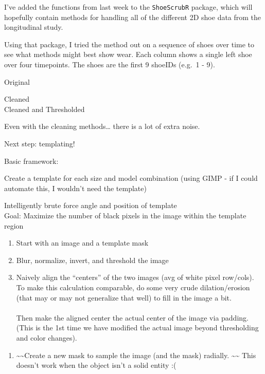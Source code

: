 \documentclass[]{book}
\providecommand{\tightlist}{%
  \setlength{\itemsep}{0pt}\setlength{\parskip}{0pt}}
\begin{document}
I've added the functions from last week to the \texttt{ShoeScrubR} package, which will hopefully contain methods for handling all of the different 2D shoe data from the longitudinal study.

Using that package, I tried the method out on a sequence of shoes over time to see what methods might best show wear. Each column shows a single left shoe over four timepoints. The shoes are the first 9 shoeIDs (e.g.~1 - 9).

Original

Cleaned\\

Cleaned and Thresholded

Even with the cleaning methods\ldots{} there is a lot of extra noise.

Next step: templating!

Basic framework:

Create a template for each size and model combination
(using GIMP - if I could automate this, I wouldn't need the template)

Intelligently brute force angle and position of template\\
Goal: Maximize the number of black pixels in the image within the template region

\begin{enumerate}
\def\labelenumi{\arabic{enumi}.}
\item
  Start with an image and a template mask
\item
  Blur, normalize, invert, and threshold the image\\
\item
  Naively align the ``centers'' of the two images (avg of white pixel row/cols). To make this calculation comparable, do some very crude dilation/erosion (that may or may not generalize that well) to fill in the image a bit.\\
  ~\\
  Then make the aligned center the actual center of the image via padding. (This is the 1st time we have modified the actual image beyond thresholding and color changes).
\end{enumerate}

\begin{enumerate}
\def\labelenumi{\arabic{enumi}.}
\setcounter{enumi}{3}
\tightlist
\item
  \textasciitilde{}\textasciitilde{}Create a new mask to sample the image (and the mask) radially. \textasciitilde{}\textasciitilde{} This doesn't work when the object isn't a solid entity :(
\end{enumerate}
\end{document}
